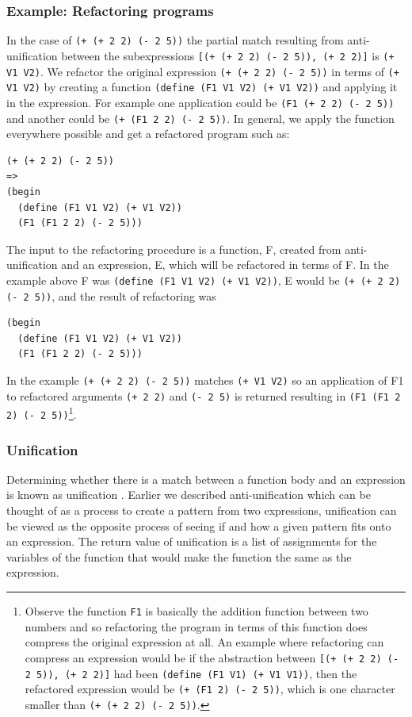 \documentclass[a4paper,10pt]{article}
\begin{document}
\subsubsection{Example: Refactoring programs}
In the case of \texttt{(+ (+ 2 2) (- 2 5))} the partial match resulting from anti-unification between the subexpressions \texttt{[(+ (+ 2 2) (- 2 5)), (+ 2 2)]} is \texttt{(+ V1 V2)}.  We refactor the original expression \texttt{(+ (+ 2 2) (- 2 5))} in terms of \texttt{(+ V1 V2)} by creating a function \texttt{(define (F1 V1 V2) (+ V1 V2))} and applying it in the expression.  For example one application could be \texttt{(F1 (+ 2 2) (- 2 5))} and another could be \texttt{(+ (F1 2 2) (- 2 5))}.  In general, we apply the function everywhere possible and get a refactored program such as:
\begin{lstlisting}
(+ (+ 2 2) (- 2 5))
=>
(begin
  (define (F1 V1 V2) (+ V1 V2))
  (F1 (F1 2 2) (- 2 5)))
\end{lstlisting}
The input to the refactoring procedure is a function, F, created from anti-unification and an expression, E, which will be refactored in terms of F.  In the example above F was \texttt{(define (F1 V1 V2) (+ V1 V2))}, E would be \texttt{(+ (+ 2 2) (- 2 5))}, and the result of refactoring was 
\begin{lstlisting}
(begin
  (define (F1 V1 V2) (+ V1 V2))
  (F1 (F1 2 2) (- 2 5)))
\end{lstlisting}

In the example \texttt{(+ (+ 2 2) (- 2 5))} matches \texttt{(+ V1 V2)} so an application of F1 to refactored arguments \texttt{(+ 2 2)} and \texttt{(- 2 5)} is returned resulting in \texttt{(F1 (F1 2 2) (- 2 5))}\footnote{Observe the function \texttt{F1} is basically the addition function between two numbers and so refactoring the program in terms of this function does compress the original expression at all.  An example where refactoring can compress an expression would be if the abstraction between \texttt{[(+ (+ 2 2) (- 2 5)), (+ 2 2)]} had been \texttt{(define (F1 V1) (+ V1 V1))}, then the refactored expression would be \texttt{(+ (F1 2) (- 2 5))}, which is one character smaller than \texttt{(+ (+ 2 2) (- 2 5))}.}.  


\subsubsection{Unification}
Determining whether there is a match between a function body and an expression is known as unification \cite{Robinson:1965:MLB:321250.321253}.  Earlier we described anti-unification which can be thought of as a process to create a pattern from two expressions, unification can be viewed as the opposite process of seeing if and how a given pattern fits onto an expression.  The return value of unification is a list of assignments for the variables of the function that would make the function the same as the expression.
\end{document}
